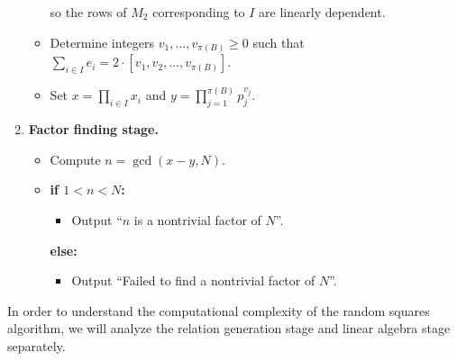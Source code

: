 \begin{algo}
\begin{enumerate}
\begin{itemize}
            so the rows of $M_2$ corresponding to $I$ are linearly 
            dependent. 
            \item Determine integers $v_1, \dots, v_{\pi(B)} \geq 0$ such that 
            $\sum_{i \in I} e_i = 2 \cdot [v_1, v_2, \dots, v_{\pi(B)}]$. 
            \item Set $x = \prod_{i\in I} x_i$ and $y = \prod_{j=1}^{\pi(B)} 
            p_j^{v_j}$. 
        \end{itemize}
        \item {\bf Factor finding stage.}
        \begin{itemize}
            \item Compute $n = \gcd(x-y, N)$. 
            \item {\bf if $1 < n < N$:}
            \begin{itemize}[$\circ$]
                \item Output ``$n$ is a nontrivial factor of $N$''.
            \end{itemize}
            {\bf else:}
            \begin{itemize}[$\circ$]
                \item Output ``Failed to find a nontrivial factor of $N$''. 
            \end{itemize}
        \end{itemize}
    \end{enumerate}
\end{algo}

\newpage 
In order to understand the computational complexity of the random squares 
algorithm, we will analyze the relation generation stage and linear algebra 
stage separately. 

